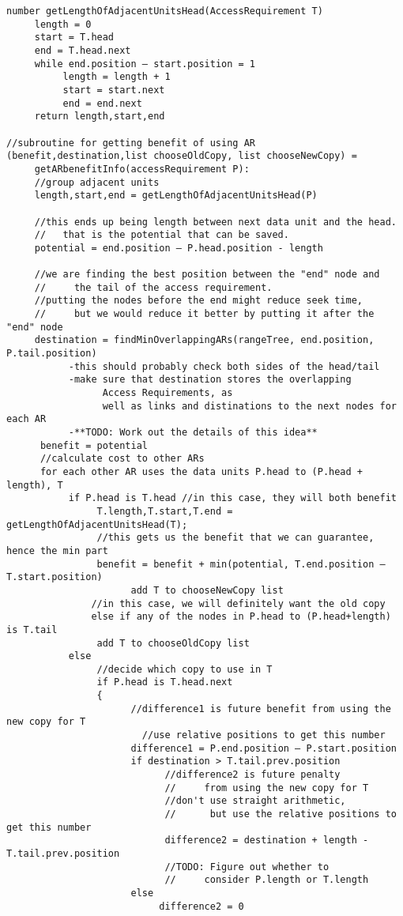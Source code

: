 \documentclass[11pt,psfig]{article}
\begin{document}
\begin{verbatim}
number getLengthOfAdjacentUnitsHead(AccessRequirement T)
     length = 0
     start = T.head
     end = T.head.next
     while end.position – start.position = 1 
          length = length + 1
          start = start.next
          end = end.next
     return length,start,end

//subroutine for getting benefit of using AR
(benefit,destination,list chooseOldCopy, list chooseNewCopy) = 
     getARbenefitInfo(accessRequirement P):
     //group adjacent units
     length,start,end = getLengthOfAdjacentUnitsHead(P)
	
     //this ends up being length between next data unit and the head. 
     //   that is the potential that can be saved.
     potential = end.position – P.head.position - length

     //we are finding the best position between the "end" node and 
     //     the tail of the access requirement.
     //putting the nodes before the end might reduce seek time, 
     //     but we would reduce it better by putting it after the "end" node
     destination = findMinOverlappingARs(rangeTree, end.position, P.tail.position)
           -this should probably check both sides of the head/tail
           -make sure that destination stores the overlapping 
                 Access Requirements, as
                 well as links and distinations to the next nodes for each AR
           -**TODO: Work out the details of this idea**
      benefit = potential
      //calculate cost to other ARs
      for each other AR uses the data units P.head to (P.head + length), T
           if P.head is T.head //in this case, they will both benefit
                T.length,T.start,T.end = getLengthOfAdjacentUnitsHead(T);
                //this gets us the benefit that we can guarantee, hence the min part
                benefit = benefit + min(potential, T.end.position – T.start.position)
			          add T to chooseNewCopy list
		       //in this case, we will definitely want the old copy
		       else if any of the nodes in P.head to (P.head+length) is T.tail
                add T to chooseOldCopy list
           else
                //decide which copy to use in T
                if P.head is T.head.next
                {
                      //difference1 is future benefit from using the new copy for T
	                    //use relative positions to get this number
                      difference1 = P.end.position – P.start.position
                      if destination > T.tail.prev.position
                            //difference2 is future penalty 
                            //     from using the new copy for T
                            //don't use straight arithmetic, 
                            //      but use the relative positions to get this number
                            difference2 = destination + length - T.tail.prev.position
                            //TODO: Figure out whether to 
                            //     consider P.length or T.length
                      else
                           difference2 = 0
				

\end{verbatim}
\end{document}
